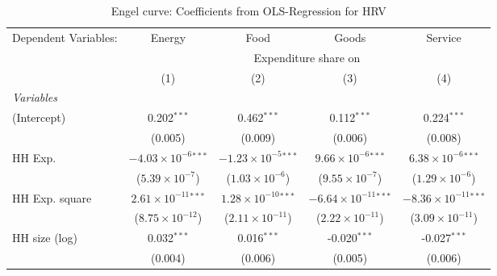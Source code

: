 
\begin{table}[htbp!]
   \centering
   \small
   \begin{adjustbox}{width = 1\textwidth, max height = 0.95\textheight, center}
      \begin{threeparttable}[b]
         \caption{\label{tab:Engel_parametric_HRV} Engel curve: Coefficients from OLS-Regression for HRV}
         \begin{tabular}{lcccc}
            \tabularnewline \midrule \midrule
            Dependent Variables: & Energy                         & Food                           & Goods                           & Service\\  
             & \multicolumn{4}{c}{Expenditure share on} \\ 
                                 & (1)                            & (2)                            & (3)                             & (4)\\  
            \midrule
            \emph{Variables}\\
            (Intercept)          & 0.202$^{***}$                  & 0.462$^{***}$                  & 0.112$^{***}$                   & 0.224$^{***}$\\   
                                 & (0.005)                        & (0.009)                        & (0.006)                         & (0.008)\\   
            HH Exp.              & $-4.03\times 10^{-6}$$^{***}$  & $-1.23\times 10^{-5}$$^{***}$  & $9.66\times 10^{-6}$$^{***}$    & $6.38\times 10^{-6}$$^{***}$\\    
                                 & ($5.39\times 10^{-7}$)         & ($1.03\times 10^{-6}$)         & ($9.55\times 10^{-7}$)          & ($1.29\times 10^{-6}$)\\    
            HH Exp. square       & $2.61\times 10^{-11}$$^{***}$  & $1.28\times 10^{-10}$$^{***}$  & $-6.64\times 10^{-11}$$^{***}$  & $-8.36\times 10^{-11}$$^{***}$\\    
                                 & ($8.75\times 10^{-12}$)        & ($2.11\times 10^{-11}$)        & ($2.22\times 10^{-11}$)         & ($3.09\times 10^{-11}$)\\    
            HH size (log)        & 0.032$^{***}$                  & 0.016$^{***}$                  & -0.020$^{***}$                  & -0.027$^{***}$\\   
                                 & (0.004)                        & (0.006)                        & (0.005)                         & (0.006)\\   

\end{tabular}
\end{threeparttable}
\end{adjustbox}
\end{table}
